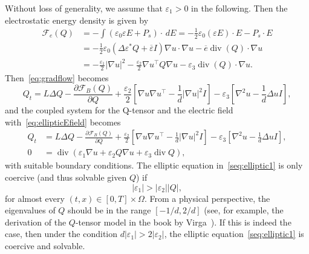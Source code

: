 \documentclass[10pt,letterpaper]{amsart}
\newcommand{\Grad}{\nabla}
\theoremstyle{definition}{\newtheorem{definition}[lemma]{Definition}}
\theoremstyle{note}{\newtheorem{claim}{Claim}[section]
\newtheorem*{claim*}{Claim}}
\numberwithin{equation}{section}
\begin{document}
Without loss of generality, we assume that $\varepsilon_1>0$ in the following.
Then the electrostatic energy density is given by
\begin{equation*}
\begin{split}
    \mathcal{F}_e(Q) 
        &= -\int (\varepsilon_0 \varepsilon E + P_s)\cdot \, d{E} = -\frac12 \varepsilon_0 (\varepsilon E)\cdot E - P_s\cdot E\\
        &= -\frac12 \varepsilon_0(\Delta\varepsilon^\ast Q + \overline{\varepsilon}I)\nabla u \cdot \nabla u - \overline{e}\operatorname{div}(Q)\cdot\nabla u\\
        &= -\frac{\varepsilon_1}{2} \lvert \nabla u\rvert^2 -\frac{\varepsilon_2}{2} \nabla u^\top Q\nabla u - \varepsilon_3\operatorname{div}(Q)\cdot\nabla u.
\end{split}
\end{equation*}
Then~\eqref{eq:gradflow} becomes
\begin{equation*}
  Q_t =  L\Delta Q - \frac{\partial \mathcal{F}_B(Q)}{\partial Q} + \frac{\varepsilon_2}{2}\left[\nabla u\nabla u^\top - \frac1d|\Grad u|^2I\right]- \varepsilon_3\left[\nabla^2u - \frac1d\Delta uI\right],
\end{equation*}
and the coupled system for the Q-tensor and the electric field with~\eqref{eq:ellipticEfield} becomes
\begin{subequations}\label{eq:fulluntruncatedpde}
	\begin{align}
	Q_t &=  L\Delta Q - \frac{\partial \mathcal{F}_B(Q)}{\partial Q} + \frac{\varepsilon_2}{2}\left[\nabla u\nabla u^\top - \frac1d|\Grad u|^2 I\right]- \varepsilon_3\left[\nabla^2u - \frac1d\Delta uI\right]  ,\\ 0&=\operatorname{div}(\varepsilon_1\nabla u + \varepsilon_2 Q\nabla u + \varepsilon_3\operatorname{div}Q),\label{seq:elliptic1}
	\end{align}
\end{subequations}
with suitable boundary conditions. The elliptic equation in~\eqref{seq:elliptic1} is only coercive (and thus solvable given $Q$) if 
\begin{equation}\label{eq:epsbound}
|\varepsilon_1|> |\varepsilon_2| |Q|,
\end{equation} 
for almost every $(t,x)\in [0,T]\times\Omega$. From a physical perspective, the eigenvalues of $Q$ should be in the range $[-1/d,2/d]$ (see, for example, the derivation of the $Q$-tensor model in the book by Virga~\cite{Virga1995}). If this is indeed the case, then under the condition $d |\varepsilon_1|>2|\varepsilon_2|$, the elliptic equation~\eqref{seq:elliptic1} is coercive and solvable.  
\end{document}
